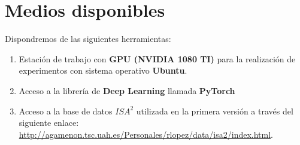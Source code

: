 \section{Medios disponibles}

Dispondremos de las siguientes herramientas:

\begin{enumerate}
	\item Estación de trabajo con \textbf{GPU (NVIDIA 1080 TI)} para la realización de experimentos con sistema operativo \textbf{Ubuntu}.
	\item Acceso a la librería de \textbf{Deep Learning} llamada \textbf{PyTorch} \cite{pytorch}
	\item Acceso a la base de datos $ISA^2$ utilizada en la primera versión \cite{isa2} a través del siguiente enlace: \url{http://agamenon.tsc.uah.es/Personales/rlopez/data/isa2/index.html}.
\end{enumerate}





